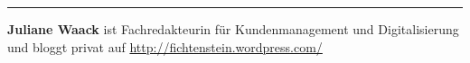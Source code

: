 \begin{center}\rule{0.5\linewidth}{\linethickness}\end{center}

\textbf{Juliane Waack} ist Fachredakteurin für Kundenmanagement und
Digitalisierung und bloggt privat auf
\url{http://fichtenstein.wordpress.com/}
